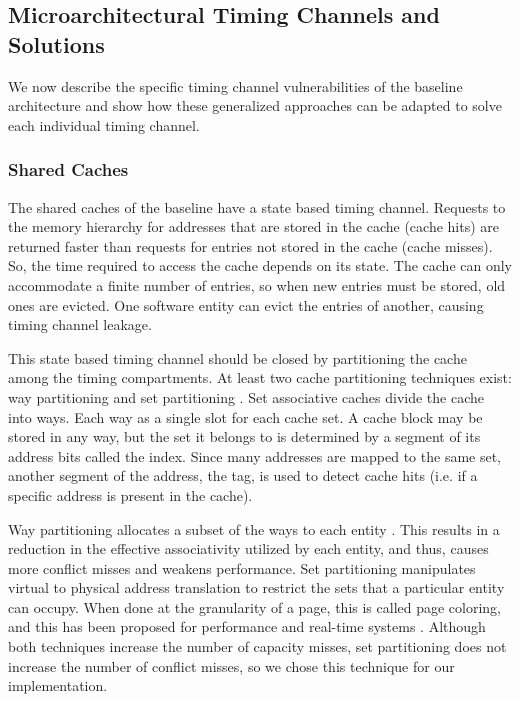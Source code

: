 \subsection{Microarchitectural Timing Channels and Solutions}
We now describe the specific timing channel vulnerabilities of the baseline 
architecture and show how these generalized approaches can be adapted to solve 
each individual timing channel.
\subsubsection{Shared Caches}
The shared caches of the baseline have a state based timing channel. Requests 
to the memory hierarchy for addresses that are stored in the cache (cache hits) 
are returned faster than requests for entries not stored in the cache (cache 
misses). So, the time required to access the cache depends on its state. The 
cache can only accommodate a finite number of entries, so when new entries must 
be stored, old ones are evicted. One software entity can evict the entries of 
another, causing timing channel leakage.

This state based timing channel should be closed by partitioning the cache 
among the timing compartments. At least two cache partitioning techniques 
exist: way partitioning and set partitioning 
\cite{rtas_cache_framework,dynamic_partitioning}. Set associative caches divide 
the cache into ways. Each way as a single slot for each cache set. A cache 
block may be stored in any way, but the set it belongs to is determined by a 
segment of its address bits called the index. Since many addresses are mapped 
to the same set, another segment of the address, the tag, is used to detect 
cache hits (i.e. if a specific address is present in the cache).

Way partitioning allocates a subset of the ways to each entity 
\cite{citation_needed}. This results in a reduction in the effective 
associativity utilized by each entity, and thus, causes more conflict misses 
and weakens performance. Set partitioning manipulates virtual to physical 
address translation to restrict the sets that a particular entity can occupy.  
When done at the granularity of a page, this is called page coloring, and this 
has been proposed for performance \cite{citation_needed} and real-time systems 
\cite{rtas_cache_framework}.  Although both techniques increase the number of 
capacity misses, set partitioning does not increase the number of conflict 
misses, so we chose this technique for our implementation.

